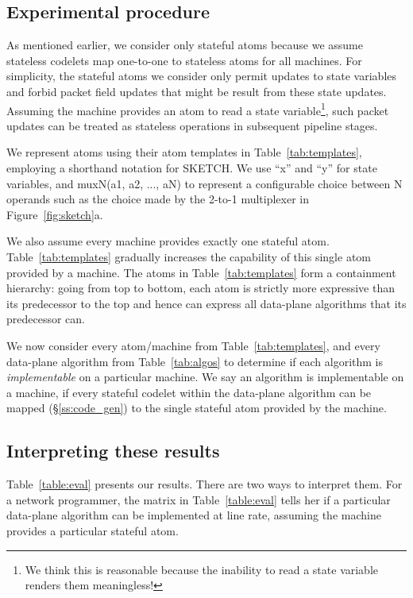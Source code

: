 \subsection{Experimental procedure}
As mentioned earlier, we consider only stateful atoms because we assume
stateless codelets map one-to-one to stateless atoms for all
\absmachine machines. For simplicity, the stateful atoms we consider only
permit updates to state variables and forbid packet field updates that might be
result from these state updates. Assuming the \absmachine machine provides an atom
to read a state variable\footnote{We think this is reasonable because the
inability to read a state variable renders them meaningless!}, such packet
updates can be treated as stateless operations in subsequent pipeline stages.

We represent atoms using their atom templates in Table~\ref{tab:templates},
employing a shorthand notation for SKETCH. We use ``x'' and ``y'' for state
variables, and muxN(a1, a2, ..., aN) to represent a configurable choice between
N operands such as the choice made by the 2-to-1 multiplexer in
Figure~\ref{fig:sketch}a.

We also assume every \absmachine machine provides exactly one
stateful atom.  Table~\ref{tab:templates} gradually increases the capability of
this single atom provided by a \absmachine machine.  The atoms in
Table~\ref{tab:templates} form a containment hierarchy: going from top to
bottom, each atom is strictly more expressive than its predecessor to the top
and hence can express all data-plane algorithms that its predecessor can.

We now consider every atom/\absmachine machine from Table~\ref{tab:templates},
and every data-plane algorithm from Table~\ref{tab:algos} to determine if each
algorithm is \textit{implementable} on a particular \absmachine machine. We
say an algorithm is implementable on a \absmachine machine, if every stateful
codelet within the data-plane algorithm can be mapped (\S\ref{ss:code_gen}) to
the single stateful atom provided by the \absmachine machine.

\subsection{Interpreting these results}
Table~\ref{table:eval} presents our results. There are two ways to interpret
them. For a network programmer, the matrix in Table~\ref{table:eval} tells her
if a particular data-plane algorithm can be implemented at line rate, assuming
the \absmachine machine provides a particular stateful atom.

